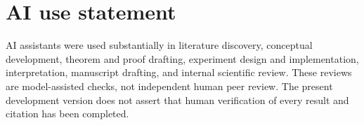 \documentclass[11pt,letterpaper]{article}
\begin{document}
\section*{AI use statement}
AI assistants were used substantially in literature discovery, conceptual
development, theorem and proof drafting, experiment design and
implementation, interpretation, manuscript drafting, and internal
scientific review. These reviews are model-assisted checks, not independent
human peer review. The present development version does not assert that
human verification of every result and citation has been completed.



\clearpage
\appendix
\label{arxiv:appendix_start}















\end{document}
